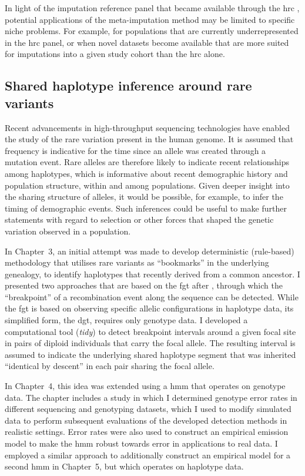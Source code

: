 In light of the imputation reference panel that became available through the \gls{hrc} \citep{McCarthy:2016gs}, potential applications of the meta-imputation method may be limited to specific niche problems.
For example, for populations that are currently underrepresented in the \gls{hrc} panel, or when novel datasets become available that are more suited for imputations into a given study cohort than the \gls{hrc} alone.




\subsection{Shared haplotype inference around rare variants}


Recent advancements in high-throughput sequencing technologies have enabled the study of the rare variation present in the human genome.
It is assumed that frequency is indicative for the time since an allele was created through a mutation event.
Rare alleles are therefore likely to indicate recent relationships among haplotypes, which is informative about recent demographic history and population structure, within and among populations.
Given deeper insight into the sharing structure of alleles, it would be possible, for example, to infer the timing of demographic events.
Such inferences could be useful to make further statements with regard to selection or other forces that shaped the genetic variation observed in a population.

In Chapter~3, an initial attempt was made to develop deterministic (rule-based) methodology that utilises rare variants as ``bookmarks'' in the underlying genealogy, to identify haplotypes that recently derived from a common ancestor.
I presented two approaches that are based on the \gls{fgt} after \citet{Hudson:1985wh}, through which the ``breakpoint'' of a recombination event along the sequence can be detected.
While the \gls{fgt} is based on observing specific allelic configurations in haplotype data, its simplified form, the \gls{dgt}, requires only genotype data.
I developed a computational tool (\emph{tidy}) to detect breakpoint intervals around a given focal site in pairs of diploid individuals that carry the focal allele.
The resulting interval is assumed to indicate the underlying shared haplotype segment that was inherited ``identical by descent'' in each pair sharing the focal allele.

In Chapter~4, this idea was extended using a \gls{hmm} that operates on genotype data.
The chapter includes a study in which I determined genotype error rates in different sequencing and genotyping datasets, which I used to modify simulated data to perform subsequent evaluations of the developed detection methods in realistic settings.
Error rates were also used to construct an empirical emission model to make the \gls{hmm} robust towards error in applications to real data.
I employed a similar approach to additionally construct an empirical model for a second \gls{hmm} in Chapter~5, but which operates on haplotype data.






